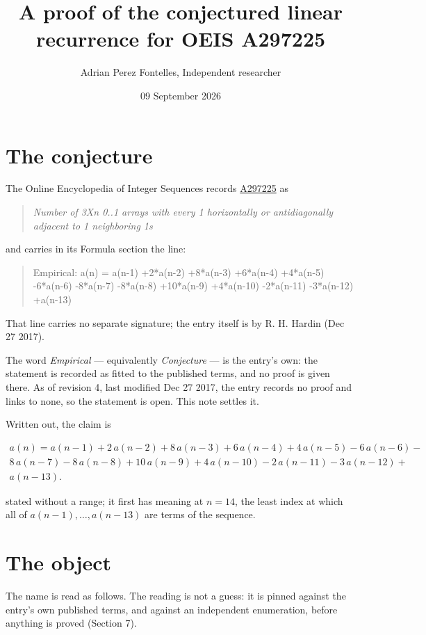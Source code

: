 \documentclass[11pt]{article}
\title{A proof of the conjectured linear recurrence for OEIS A297225}
\author{Adrian Perez Fontelles, Independent researcher}
\date{09 September 2026}
\theoremstyle{definition}
\begin{document}
\maketitle
\section{The conjecture}

The Online Encyclopedia of Integer Sequences records \href{https://oeis.org/A297225}{A297225} as

\begin{quote}\itshape Number of 3Xn 0..1 arrays with every 1 horizontally or antidiagonally adjacent to 1 neighboring 1s\end{quote}

and carries in its Formula section the line:

\begin{quote}\ttfamily Empirical: a(n) = a(n-1) +2*a(n-2) +8*a(n-3) +6*a(n-4) +4*a(n-5) -6*a(n-6) -8*a(n-7) -8*a(n-8) +10*a(n-9) +4*a(n-10) -2*a(n-11) -3*a(n-12) +a(n-13)\end{quote}

That line carries no separate signature; the entry itself is by R. H. Hardin (Dec 27 2017).

The word {\itshape Empirical} --- equivalently {\itshape Conjecture} --- is the entry's own: the statement is recorded as fitted to the published terms, and no proof is given there. As of revision 4, last modified Dec 27 2017, the entry records no proof and links to none, so the statement is open. This note settles it.

Written out, the claim is

\begin{multline*} a(n) = a(n-1) + 2\,a(n-2) + 8\,a(n-3) + 6\,a(n-4) + 4\,a(n-5) - 6\,a(n-6) - \\ 8\,a(n-7) - 8\,a(n-8) + 10\,a(n-9) + 4\,a(n-10) - 2\,a(n-11) - 3\,a(n-12) + \\ a(n-13). \end{multline*}

stated without a range; it first has meaning at $n = 14$, the least index at which all of $a(n-1),\dots,a(n-13)$ are terms of the sequence.

\section{The object}

The name is read as follows. The reading is not a guess: it is pinned against the entry's own published terms, and against an independent enumeration, before anything is proved (Section 7).
\end{document}
